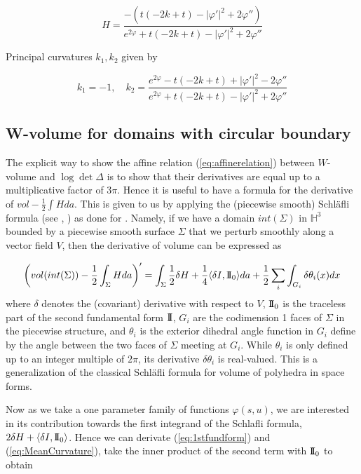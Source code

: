 \documentclass[12pt]{amsart}
\newcommand{\II}{{\rm I}\!{\rm I}}
\begin{document}
\begin{equation}\label{eq:MeanCurvature}
    H = \frac{-(t(-2k+t) - |\varphi'|^2 + 2\varphi'')}{e^{2\varphi} + t(-2k+t) - |\varphi'|^2 + 2\varphi''}
\end{equation}



Principal curvatures $k_1, k_2$ given by 

\[k_1=-1,\quad k_2 = \frac{e^{2\varphi} - t(-2k+t) + |\varphi'|^2 - 2\varphi''}{e^{2\varphi} + t(-2k+t) - |\varphi'|^2 + 2\varphi''}
\]


\subsection{W-volume for domains with circular boundary}\label{subsec:W-vol}
The explicit way to show the affine relation (\ref{eq:affinerelation}) between $W$-volume and $\log\det\Delta$ is to show that their derivatives are equal up to a multiplicative factor of $3\pi$. Hence it is useful to have a formula for the derivative of $vol-\frac12\int Hda$. This is given to us by applying the (piecewise smooth) Schl\"afli formula (see \cite[Theorem 1]{RivinSchlenker}, \cite[Theorem 4]{Souam}) as done for \cite[Equation (41)]{KrasnovSchlenker08}. Namely, if we have a domain $int(\Sigma)$ in $\mathbb{H}^3$ bounded by a piecewise smooth surface $\Sigma$ that we perturb smoothly along a vector field $V$, then the derivative of volume can be expressed as

\begin{equation}\label{eq:WSchlafli}
    \left(vol(int(\Sigma))-\frac12 \int_\Sigma Hda\right)' = \int_\Sigma \frac12\delta H + \frac14\langle \delta I, \II_0 \rangle da + \frac12\sum_i \int_{G_i} \delta\theta_i(x)dx
\end{equation}
where $\delta$ denotes the (covariant) derivative with respect to $V$, $\II_0$ is the traceless part of the second fundamental form $\II$, $G_i$ are the codimension 1 faces of $\Sigma$ in the piecewise structure, and $\theta_i$ is the exterior dihedral angle function in $G_i$ define by the angle between the two faces of $\Sigma$ meeting at $G_i$. While $\theta_i$ is only defined up to an integer multiple of $2\pi$, its derivative $\delta\theta_i$ is real-valued. This is a generalization of the classical Schl\"afli formula for volume of polyhedra in space forms.

Now as we take a one parameter family of functions $\varphi(s,u)$, we are interested in its contribution towards the first integrand of the Schlafli formula, $2\delta H + \langle \delta I, \II_0 \rangle$. Hence we can derivate (\ref{eq:1stfundform}) and (\ref{eq:MeanCurvature}), take the inner product of the second term with $\II_0$ to obtain
\end{document}
